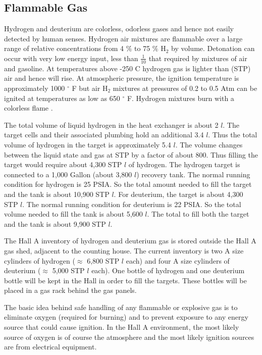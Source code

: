 \begin{safetyen}{10}{5}
\subsection{Flammable Gas}
\label{sec:targ-flammablegas}

Hydrogen and deuterium are
colorless, odorless gases and hence not easily detected by human senses.
Hydrogen air mixtures are flammable over a large range of relative
concentrations from 4 $\%$ to 75 $\%$ H$_2$ by volume. Detonation
can occur with very low energy input, less than $\frac{1}{10}$
that required by mixtures of air and gasoline. At temperatures above
-250 C hydrogen gas is lighter than (STP) air and hence will rise.
At atmospheric pressure, the ignition temperature is approximately
1000 $^\circ$ F but air H$_2$ mixtures at pressures of 0.2 to 0.5 Atm can be
ignited at temperatures as low as 650 $^\circ$ F. Hydrogen mixtures
burn with a colorless flame \cite{bi:mc75}.

The total volume of liquid hydrogen in the heat exchanger is about
2 $l$. The target cells and their associated plumbing hold
an additional 3.4 $l$. Thus the total volume of hydrogen
in the target is approximately 5.4 $l$. The volume changes between
the liquid state and gas at STP by a factor of about 800.
Thus filling the target
would require about 4,300 STP $l$ of hydrogen. The hydrogen target is 
connected to a 1,000 Gallon (about 3,800 $l$) recovery tank. The normal 
running condition for hydrogen is 25 PSIA. So the total amount needed
to fill the target and the tank is about 10,900 STP $l$. 
For deuterium, the target is about 4,300 STP $l$. The normal running
condition for deuterium is 22 PSIA. So the total volume needed
to fill the tank is about 5,600 $l$.
The total to fill both the target and the tank is 
about 9,900 STP $l$.

The Hall A inventory of hydrogen and deuterium gas is stored
outside the Hall A gas shed, adjacent to the counting house.
The current inventory is two A size cylinders of hydrogen
($\approx$ 6,800 STP $l$ each) and four A size cylinders
of deuterium ($\approx$ 5,000 STP $l$ each). 
One bottle of hydrogen and one deuterium bottle will be kept in the Hall
in order to fill the targets. These bottles will be placed in a gas rack behind
the gas panels. 

The basic idea behind safe handling of any flammable or explosive gas
is to eliminate oxygen (required for burning)
and to prevent exposure to any energy source that could cause ignition.
In the Hall A environment, the most likely source of oxygen is of course the
atmosphere and the most likely ignition sources are from electrical equipment.


\end{safetyen}
